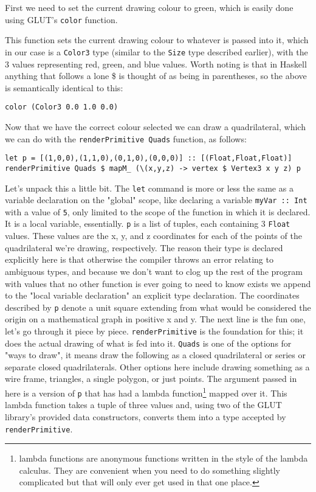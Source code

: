 \documentclass[12pt, a4paper]{report}
\begin{document}
First we need to set the current drawing colour to green, which is easily done using GLUT's \verb|color| function.

This function sets the current drawing colour to whatever is passed into it, which in our case is a \verb|Color3| type (similar to the \verb|Size| type described earlier), with the 3 values representing red, green, and blue values.
Worth noting is that in Haskell anything that follows a lone \$ is thought of as being in parentheses, so the above is semantically identical to this:

\begin{lstlisting}
color (Color3 0.0 1.0 0.0)
\end{lstlisting}

Now that we have the correct colour selected we can draw a quadrilateral, which we can do with the \verb|renderPrimitive Quads| function, as follows:

\begin{lstlisting}[xleftmargin=-0.1\textwidth, xrightmargin=-0.1\textwidth]
let p = [(1,0,0),(1,1,0),(0,1,0),(0,0,0)] :: [(Float,Float,Float)]
renderPrimitive Quads $ mapM_ (\(x,y,z) -> vertex $ Vertex3 x y z) p
\end{lstlisting}

Let's unpack this a little bit.
The \verb|let| command is more or less the same as a variable declaration on the "global" scope, like declaring a variable \verb|myVar :: Int| with a value of \verb|5|, only limited to the scope of the function in which it is declared.
It is a local variable, essentially.
\verb|p| is a list of tuples, each containing 3 \verb|Float| values.
These values are the x, y, and z coordinates for each of the points of the quadrilateral we're drawing, respectively.
The reason their type is declared explicitly here is that otherwise the compiler throws an error relating to ambiguous types, and because we don't want to clog up the rest of the program with values that no other function is ever going to need to know exists we append to the "local variable declaration" an explicit type declaration.
The coordinates described by \verb|p| denote a unit square extending from what would be considered the origin on a mathematical graph in positive x and y.
The next line is the fun one, let's go through it piece by piece.
\verb|renderPrimitive| is the foundation for this; it does the actual drawing of what is fed into it.
\verb|Quads| is one of the options for "ways to draw", it means draw the following as a closed quadrilateral or series or separate closed quadrilaterals.
Other options here include drawing something as a wire frame, triangles, a single polygon, or just points.
The argument passed in here is a version of \verb|p| that has had a lambda function\footnote{lambda functions are anonymous functions written in the style of the lambda calculus. They are convenient when you need to do something slightly complicated but that will only ever get used in that one place.} mapped over it.
This lambda function takes a tuple of three values and, using two of the GLUT library's provided data constructors, converts them into a type accepted by \verb|renderPrimitive|.
\end{document}
